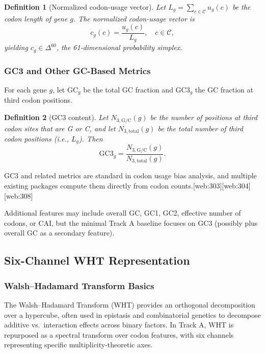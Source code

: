 \documentclass[11pt]{article}
\newtheorem{definition}{Definition}[section]
\begin{document}
\begin{definition}[Normalized codon-usage vector]
Let \(L_g = \sum_{c \in \mathcal{C}} u_g(c)\) be the codon length of gene \(g\).
The normalized codon-usage vector is
\[
  c_g(c) = \frac{u_g(c)}{L_g}, \quad c \in \mathcal{C},
\]
yielding \(c_g \in \Delta^{60}\), the 61-dimensional probability simplex.
\end{definition}

\subsubsection{GC3 and Other GC-Based Metrics}

For each gene \(g\), let \(\mathrm{GC}_g\) be the total GC fraction and \(\mathrm{GC3}_g\) the GC fraction at third codon positions.

\begin{definition}[GC3 content]
Let \(N_{3,\mathrm{G/C}}(g)\) be the number of positions at third codon sites that are G or C, and let \(N_{3,\mathrm{total}}(g)\) be the total number of third codon positions (i.e., \(L_g\)).
Then
\[
  \mathrm{GC3}_g = \frac{N_{3,\mathrm{G/C}}(g)}{N_{3,\mathrm{total}}(g)}.
\]
\end{definition}

GC3 and related metrics are standard in codon usage bias analysis, and multiple existing packages compute them directly from codon counts.[web:303][web:304][web:308]

Additional features may include overall GC, GC1, GC2, effective number of codons, or CAI, but the minimal Track A baseline focuses on GC3 (possibly plus overall GC as a secondary feature).

\subsection{Six-Channel WHT Representation}

\subsubsection{Walsh--Hadamard Transform Basics}

The Walsh--Hadamard Transform (WHT) provides an orthogonal decomposition over a hypercube, often used in epistasis and combinatorial genetics to decompose additive vs.\ interaction effects across binary factors.
In Track A, WHT is repurposed as a spectral transform over codon features, with six channels representing specific multiplicity-theoretic axes.
\end{document}

